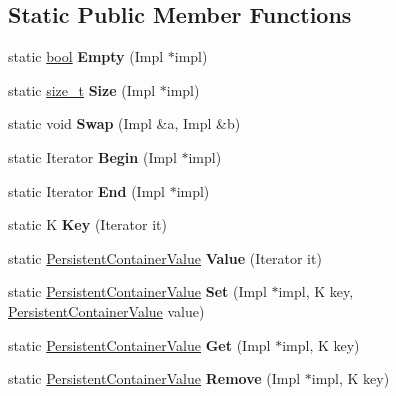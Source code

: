 \subsection*{Static Public Member Functions}
\begin{DoxyCompactItemize}
\item 
\mbox{\label{classv8_1_1StdMapTraits_a63765723a9d6457ef47a42f79b13eaf7}} 
static \mbox{\hyperlink{classbool}{bool}} {\bfseries Empty} (Impl $\ast$impl)
\item 
\mbox{\label{classv8_1_1StdMapTraits_a60bd7720bbc6e662d948cf05283a009d}} 
static \mbox{\hyperlink{classsize__t}{size\+\_\+t}} {\bfseries Size} (Impl $\ast$impl)
\item 
\mbox{\label{classv8_1_1StdMapTraits_ae018f70b3284ffda2566c36156db8baa}} 
static void {\bfseries Swap} (Impl \&a, Impl \&b)
\item 
\mbox{\label{classv8_1_1StdMapTraits_abc24bdbd2e7b054a7bd905759fad7987}} 
static Iterator {\bfseries Begin} (Impl $\ast$impl)
\item 
\mbox{\label{classv8_1_1StdMapTraits_a3ac36ae9e3b5585faeb66bb744c24183}} 
static Iterator {\bfseries End} (Impl $\ast$impl)
\item 
\mbox{\label{classv8_1_1StdMapTraits_aa90a541b794946054fbc1e76e3976c4f}} 
static K {\bfseries Key} (Iterator it)
\item 
\mbox{\label{classv8_1_1StdMapTraits_ad85f9d7e2ac639208fbce6b04d2436ad}} 
static \mbox{\hyperlink{classuintptr__t}{Persistent\+Container\+Value}} {\bfseries Value} (Iterator it)
\item 
\mbox{\label{classv8_1_1StdMapTraits_a2f41e206a3b1c9806253cca40d2891b1}} 
static \mbox{\hyperlink{classuintptr__t}{Persistent\+Container\+Value}} {\bfseries Set} (Impl $\ast$impl, K key, \mbox{\hyperlink{classuintptr__t}{Persistent\+Container\+Value}} value)
\item 
\mbox{\label{classv8_1_1StdMapTraits_a96c6fa384a4f7b7a64b464457ff347c2}} 
static \mbox{\hyperlink{classuintptr__t}{Persistent\+Container\+Value}} {\bfseries Get} (Impl $\ast$impl, K key)
\item 
\mbox{\label{classv8_1_1StdMapTraits_ad35e42652392e70dd23fa4b69b9800ea}} 
static \mbox{\hyperlink{classuintptr__t}{Persistent\+Container\+Value}} {\bfseries Remove} (Impl $\ast$impl, K key)
\end{DoxyCompactItemize}


